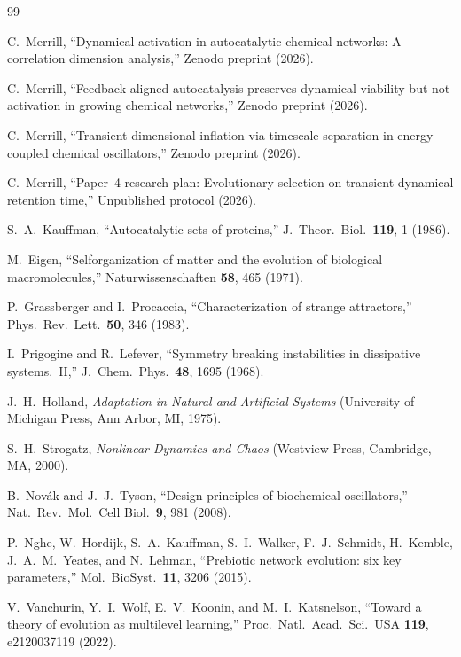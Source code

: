 \documentclass[twocolumn,showpacs,preprintnumbers,amsmath,amssymb,prd,floatfix]{revtex4-2}
\begin{document}
\begin{thebibliography}{99}

C.~Merrill, ``Dynamical activation in autocatalytic chemical networks: A correlation dimension analysis,''
Zenodo preprint (2026).

C.~Merrill, ``Feedback-aligned autocatalysis preserves dynamical viability but not activation in growing chemical networks,''
Zenodo preprint (2026).

C.~Merrill, ``Transient dimensional inflation via timescale separation in energy-coupled chemical oscillators,''
Zenodo preprint (2026).

C.~Merrill, ``Paper~4 research plan: Evolutionary selection on transient dynamical retention time,''
Unpublished protocol (2026).

S.~A.~Kauffman, ``Autocatalytic sets of proteins,''
J.\ Theor.\ Biol.\ \textbf{119}, 1 (1986).

M.~Eigen, ``Selforganization of matter and the evolution of biological macromolecules,''
Naturwissenschaften \textbf{58}, 465 (1971).

P.~Grassberger and I.~Procaccia, ``Characterization of strange attractors,''
Phys.\ Rev.\ Lett.\ \textbf{50}, 346 (1983).

I.~Prigogine and R.~Lefever, ``Symmetry breaking instabilities in dissipative systems.\ II,''
J.\ Chem.\ Phys.\ \textbf{48}, 1695 (1968).

J.~H.~Holland, \textit{Adaptation in Natural and Artificial Systems}
(University of Michigan Press, Ann Arbor, MI, 1975).

S.~H.~Strogatz, \textit{Nonlinear Dynamics and Chaos}
(Westview Press, Cambridge, MA, 2000).

B.~Nov\'{a}k and J.~J.~Tyson, ``Design principles of biochemical oscillators,''
Nat.\ Rev.\ Mol.\ Cell Biol.\ \textbf{9}, 981 (2008).

P.~Nghe, W.~Hordijk, S.~A.~Kauffman, S.~I.~Walker, F.~J.~Schmidt, H.~Kemble, J.~A.~M.~Yeates, and N.~Lehman,
``Prebiotic network evolution: six key parameters,''
Mol.\ BioSyst.\ \textbf{11}, 3206 (2015).

V.~Vanchurin, Y.~I.~Wolf, E.~V.~Koonin, and M.~I.~Katsnelson,
``Toward a theory of evolution as multilevel learning,''
Proc.\ Natl.\ Acad.\ Sci.\ USA \textbf{119}, e2120037119 (2022).

\end{thebibliography}
\end{document}
